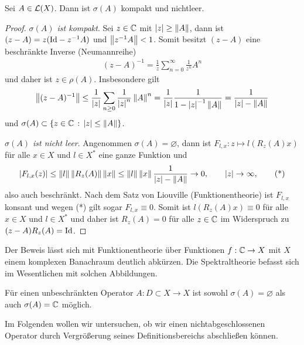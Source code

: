 \begin{cor}
\label{prop:3.4}
Sei $A \in \mathcal{L}(X)$. Dann ist $\sigma(A)$ kompakt und nichtleer.\fishhere
\end{cor}
\begin{proof}
\textit{$\sigma(A)$ ist kompakt}.
Sei $z\in \mathbb{C}$ mit $\left|z\right|\ge \left\|A\right\|$, dann ist $(z-A) = z(\mathrm{Id}-z^{-1}A)$ und
$\left\|z^{-1}A\right\| < 1$. Somit besitzt $(z-A)$ eine beschränkte Inverse
(Neumannreihe)
\begin{align*}
(z-A)^{-1} = \frac{1}{z}\sum_{n=0}^\infty \frac{1}{z^n}A^n
\end{align*}
und daher ist $z\in\rho(A)$. Insbesondere gilt
\begin{align*}
\left\|(z-A)^{-1}\right\| \le \frac{1}{\left|z\right|}\sum_{n\ge0}
\frac{1}{\left|z\right|^n}\left\|A\right\|^n
= \frac{1}{\left|z\right|}\frac{1}{1-\left|z\right|^{-1}\left\|A\right\|} = \frac{1}{\left|z\right|-\left\|A\right\|}
\end{align*}
und $\sigma(A)\subset\left\{ z\in\mathbb{C}\,:\,\left|z\right|\le \left\|A\right\|\right\}$.

\textit{$\sigma(A)$ ist nicht leer}.
Angenommen $\sigma(A)= \varnothing$, dann ist $F_{l,x} : z\mapsto l(R_z(A)x)$
für alle $x\in X$ und $l\in X^*$
eine ganze Funktion und
\begin{align*}
\left|F_{l,x}(z)\right| \le \left\|l\right\|\left\|R_z(A)\right\|\left\|x\right\| \le
\left\|l\right\|\left\|x\right\|\frac{1}{\left|z\right|-\left\|A\right\|}\to 0,\qquad \left|z\right|\to
\infty,\tag{*}
\end{align*}
also auch beschränkt.
Nach dem Satz von Liouville (Funktionentheorie) ist $F_{l,x}$ konsant und wegen
(*) gilt sogar $F_{l,x}\equiv 0$. Somit ist
$l(R_z(A)x)\equiv 0$ für alle $x\in X$ und $l\in X^*$ und daher ist $R_z(A)=0$
für alle $z\in\mathbb{C}$ im Widerspruch zu $(z-A)R_z(A) = \mathrm{Id}$.\qedhere
\end{proof}

Der Beweis lässt sich mit Funktionentheorie über Funktionen $f: \mathbb{C}\to X$
mit $X$ einem komplexen Banachraum deutlich abkürzen. Die Spektraltheorie
befasst sich im Wesentlichen mit solchen Abbildungen.

\begin{bem*}
Für einen unbeschränkten Operator $A:D\subset X\to X$ ist sowohl
$\sigma(A)=\varnothing$ als auch $\sigma(A) = \mathbb{C}$ möglich.\maphere
\end{bem*}

Im Folgenden wollen wir untersuchen, ob wir einen nichtabgeschlossenen Operator
durch Vergrößerung seines Definitionsbereichs abschließen können.

